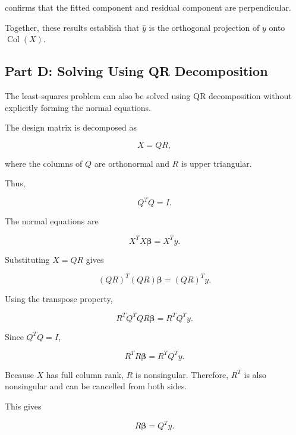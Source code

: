 \documentclass[12pt,a4paper]{article}
\numberwithin{equation}{section}
\begin{document}
confirms that the fitted component and residual
component are perpendicular.

Together, these results establish that
$\hat{y}$ is the orthogonal projection
of $y$ onto $\operatorname{Col}(X)$.

\subsection{Part D: Solving Using QR Decomposition}

The least-squares problem can also be solved
using QR decomposition without explicitly
forming the normal equations.

The design matrix is decomposed as

\begin{equation}
X=QR,
\end{equation}

where the columns of $Q$ are orthonormal and
$R$ is upper triangular.

Thus,

\begin{equation}
Q^TQ=I.
\end{equation}

The normal equations are

\begin{equation}
X^TX\boldsymbol{\beta}=X^Ty.
\end{equation}

Substituting $X=QR$ gives

\begin{equation}
(QR)^T(QR)\boldsymbol{\beta}
=(QR)^Ty.
\end{equation}

Using the transpose property,

\begin{equation}
R^TQ^TQR\boldsymbol{\beta}
=R^TQ^Ty.
\end{equation}

Since $Q^TQ=I$,

\begin{equation}
R^TR\boldsymbol{\beta}
=R^TQ^Ty.
\end{equation}

Because $X$ has full column rank, $R$ is
nonsingular. Therefore, $R^T$ is also
nonsingular and can be cancelled from both
sides.

This gives

\begin{equation}
\boxed{R\boldsymbol{\beta}=Q^Ty}.
\end{equation}
\end{document}
